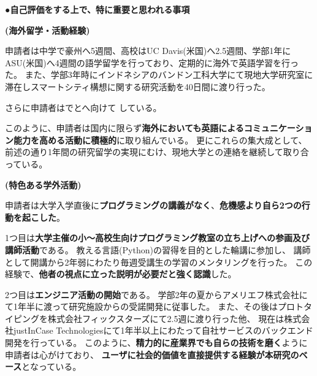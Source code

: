 {\noindent
●\textbf{自己評価をする上で、特に重要と思われる事項}

%

\textbf{(海外留学・活動経験)}

申請者は中学で豪州へ5週間、高校はUC Davis(米国)へ2.5週間、学部1年にASU(米国)へ4週間の語学留学を行っており、定期的に海外で英語学習を行った。
また、学部3年時にインドネシアのバンドン工科大学にて現地大学研究室に滞在しスマートシティ構想に関する研究活動を40日間に渡り行った。

さらに申請者はでとへ向けて
している。

このように、申請者は国内に限らず\textbf{海外においても英語によるコミュニケーション能力を高める活動に積極的}に取り組んでいる。
更にこれらの集大成として、前述の通り1年間の研究留学の実現にむけ、現地大学との連絡を継続して取り合っている。

\textbf{(特色ある学外活動)}

申請者は大学入学直後に\textbf{プログラミングの講義がなく}、\textbf{危機感より自ら2つの行動を起こした}。

1つ目は\textbf{大学主催の小〜高校生向けプログラミング教室の立ち上げへの参画及び講師活動}\cite{uecprog}である。
教える言語(Python)の習得を目的とした輪講に参加し、
講師として開講から2年弱にわたり毎週受講生の学習のメンタリングを行った。
この経験で、\textbf{他者の視点に立った説明が必要だと強く認識}した。

2つ目は\textbf{エンジニア活動の開始}である。
学部2年の夏からアメリエフ株式会社にて1年半に渡って研究施設からの受諾開発に従事した\cite{amelieff}。
また、その後はプロトタイピングを株式会社フィックスターズにて2.5週に渡り行った他、
現在は株式会社justInCase Technologiesにて1年半以上にわたって自社サービスのバックエンド開発を行っている\cite{jic-tech}。
このように、\textbf{精力的に産業界でも自らの技術を磨く}ように申請者は心がけており、
\textbf{ユーザに社会的価値を直接提供する経験が本研究のベース}となっている。

}
